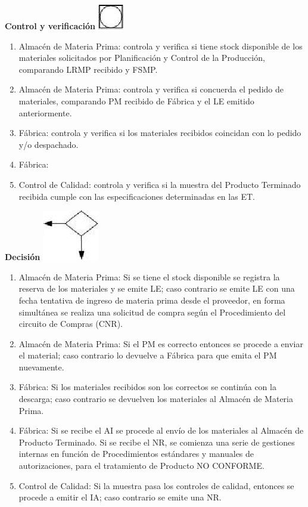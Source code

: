 \begin{center}
  \textbf{Control y verificación}
  \includegraphics{./Images/Simbolos/simbolo-Control-y-Verificacion.png}
\end{center}
\begin{enumerate}
  \item Almac\'en de Materia Prima: controla y verifica si tiene stock disponible de los materiales solicitados por Planificaci\'on y Control de la Producci\'on, comparando LRMP recibido y FSMP.
  \item Almac\'en de Materia Prima: controla y verifica si concuerda el pedido de materiales, comparando PM recibido de F\'abrica y el LE emitido anteriormente.
  \item F\'abrica: controla y verifica si los materiales recibidos coincidan con lo pedido y/o despachado.
  \item F\'abrica: 
  \item Control de Calidad: controla y verifica si la muestra del Producto Terminado recibida cumple con las especificaciones determinadas en las ET.
\end{enumerate}

\begin{center}
  \textbf{Decisión}
  \includegraphics{./Images/Simbolos/simbolo-Decision.png}
\end{center}
\begin{enumerate}
  \item Almac\'en de Materia Prima: Si se tiene el stock disponible se registra la reserva de los materiales y se emite LE; caso contrario se emite LE con una fecha tentativa de ingreso de materia prima desde el proveedor, en forma simult\'anea se realiza una solicitud de compra seg\'un el Procedimiento del circuito de Compras (CNR).
  \item Almac\'en de Materia Prima: Si el PM es correcto entonces se procede a enviar el material; caso contrario lo devuelve a F\'abrica para que emita el PM nuevamente.
  \item F\'abrica: Si los materiales recibidos son los correctos se contin\'ua con la descarga; caso contrario se devuelven los materiales al Almac\'en de Materia Prima.
  \item F\'abrica: Si se recibe el AI se procede al env\'io de los materiales al Almac\'en de Producto Terminado. Si se recibe el NR, se comienza una serie de gestiones internas en funci\'on de Procedimientos est\'andares y manuales de autorizaciones, para el tratamiento de Producto NO CONFORME.
  \item Control de Calidad: Si la muestra pasa los controles de calidad, entonces se procede a emitir el IA; caso contrario se emite una NR.
\end{enumerate}

